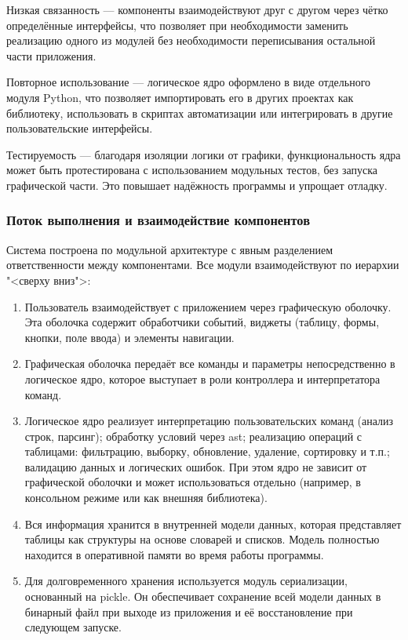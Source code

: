 Низкая связанность — компоненты взаимодействуют друг с другом через чётко определённые интерфейсы, что позволяет при необходимости заменить реализацию одного из модулей без необходимости переписывания остальной части приложения.

Повторное использование — логическое ядро оформлено в виде отдельного модуля Python, что позволяет импортировать его в других проектах как библиотеку, использовать в скриптах автоматизации или интегрировать в другие пользовательские интерфейсы.

Тестируемость — благодаря изоляции логики от графики, функциональность ядра может быть протестирована с использованием модульных тестов, без запуска графической части. Это повышает надёжность программы и упрощает отладку.

\subsubsection{Поток выполнения и взаимодействие компонентов}

Система построена по модульной архитектуре с явным разделением ответственности между компонентами. Все модули взаимодействуют по иерархии "<сверху вниз">:
\begin{enumerate}
	\item Пользователь взаимодействует с приложением через графическую оболочку. Эта оболочка содержит обработчики событий, виджеты (таблицу, формы, кнопки, поле ввода) и элементы навигации.
	\item Графическая оболочка передаёт все команды и параметры непосредственно в логическое ядро, которое выступает в роли контроллера и интерпретатора команд.
	\item Логическое ядро реализует	интерпретацию пользовательских команд (анализ строк, парсинг); обработку условий через ast; реализацию операций с таблицами: фильтрацию, выборку, обновление, удаление, сортировку и т.п.; валидацию данных и логических ошибок. При этом ядро не зависит от графической оболочки и может использоваться отдельно (например, в консольном режиме или как внешняя библиотека).
	\item Вся информация хранится в внутренней модели данных, которая представляет таблицы как структуры на основе словарей и списков. Модель полностью находится в оперативной памяти во время работы программы.
	\item Для долговременного хранения используется модуль сериализации, основанный на pickle. Он обеспечивает сохранение всей модели данных в бинарный файл при выходе из приложения и её восстановление при следующем запуске.
\end{enumerate}

